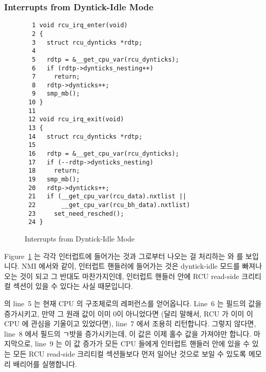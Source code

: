 \subsubsection{Interrupts from Dyntick-Idle Mode}
\label{app:rcuimpl:rcutreewt:Interrupts from Dyntick-Idle Mode}

\begin{figure}[tbp]
{ \scriptsize
\begin{verbatim}
  1 void rcu_irq_enter(void)
  2 {
  3   struct rcu_dynticks *rdtp;
  4
  5   rdtp = &__get_cpu_var(rcu_dynticks);
  6   if (rdtp->dynticks_nesting++)
  7     return;
  8   rdtp->dynticks++;
  9   smp_mb();
 10 }
 11
 12 void rcu_irq_exit(void)
 13 {
 14   struct rcu_dynticks *rdtp;
 15
 16   rdtp = &__get_cpu_var(rcu_dynticks);
 17   if (--rdtp->dynticks_nesting)
 18     return;
 19   smp_mb();
 20   rdtp->dynticks++;
 21   if (__get_cpu_var(rcu_data).nxtlist ||
 22       __get_cpu_var(rcu_bh_data).nxtlist)
 23     set_need_resched();
 24 }
\end{verbatim}
}
\caption{Interrupts from Dyntick-Idle Mode}
\label{fig:app:rcuimpl:rcutreewt:Interrupts from Dyntick-Idle Mode}
\end{figure}

Figure~\ref{fig:app:rcuimpl:rcutreewt:Interrupts from Dyntick-Idle Mode}
는 각각 인터럽트에 들어가는 것과 그로부터 나오는 걸 처리하는
 와  를 보입니다.
NMI 에서와 같이, 인터럽트 핸들러에 들어가는 것은 dyntick-idle 모드를 빠져나오는
것이 되고 그 반대도 마찬가지인데, 인터럽트 핸들러 안에 RCU read-side 크리티컬
섹션이 있을 수 있다는 사실 때문입니다.
\iffalse

Figure~\ref{fig:app:rcuimpl:rcutreewt:Interrupts from Dyntick-Idle Mode}
shows \co{rcu_irq_enter()} and \co{rcu_irq_exit()}, which handle
interrupt entry and exit, respectively.
As with NMIs, it is important to note that entering an interrupt
handler exits dyntick-idle mode and vice versa, due to the fact
that RCU read-side critical sections can appear in interrupt handlers.
\fi

 의 line~5 는 현재 CPU 의  구조체로의
레퍼런스를 얻어옵니다.
Line~6 는  필드의 값을 증가시키고, 만약 그 원래 값이
이미 0이 아니었다면 (달리 말해서, RCU 가 이미 이 CPU 에 관심을 기울이고
있었다면), line~7 에서 조용히 리턴합니다.
그렇지 않다면, line~8 에서  필드의 ㄱ밧을 증가시키는데, 이 값은
이제 홀수 값을 가져야만 합니다.
마지막으로, line~9 는 이 값 증가가 모든 CPU 들에게 인터럽트 핸들러 안에 있을 수
있는 모든 RCU read-side 크리티컬 섹션들보다 먼저 일어난 것으로 보일 수 있도록
메모리 배리어를 실행합니다.
\iffalse


